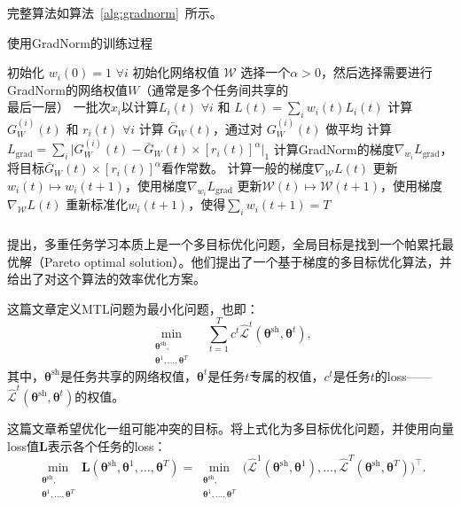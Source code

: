 \documentclass{ctexart}
\begin{document}
完整算法如算法~\ref{alg:gradnorm}~所示。

\begin{algorithm}[htb]
    \caption{使用GradNorm的训练过程}
    \label{alg:gradnorm}
 \begin{algorithmic}
    \State 初始化 $w_i(0)=1$ $\forall i$
    \State 初始化网络权值 $\mathcal{W}$
    \State 选择一个$\alpha> 0$，然后选择需要进行GradNorm的网络权值$W$（通常是多个任务间共享的\\ \hspace{1em} 最后一层）
    一批次$x_i$以计算$L_i(t)$ $\forall i$ 和 $L(t) = \sum_i w_i(t)L_i(t)$ 
    \State 计算 $G_W^{(i)}(t)$ 和 $r_i(t)$ $\forall i$
    \State 计算 $\bar{G}_W(t)$，通过对 $G_W^{(i)}(t)$ 做平均
    \State 计算 $L_{\text{grad}}= \sum_i\rvert G_W^{(i)}(t) - \bar{G}_W(t)\times [r_i(t)]^{\alpha}\rvert_1$
    \State 计算GradNorm的梯度$\nabla_{w_i} L_{\text{grad}}$，将目标$\bar{G}_W(t)\times [r_i(t)]^{\alpha}$看作常数。
    \State 计算一般的梯度$\nabla_{\mathcal{W}} L(t)$
    \State 更新$w_i(t) \mapsto w_i(t+1)$，使用梯度$\nabla_{w_i} L_{\text{grad}}$
    \State 更新$\mathcal{W}(t) \mapsto \mathcal{W}(t+1)$，使用梯度$\nabla_{\mathcal{W}} L(t)$ 
    \State 重新标准化$w_i(t+1)$，使得$\sum_iw_i(t+1) = T$
    \EndFor
 \end{algorithmic}
 \end{algorithm}

\subsubsection{}

\citet{Sener18Pareto}提出，多重任务学习本质上是一个多目标优化问题，全局目标是找到一个帕累托最优解（Pareto optimal solution）。他们提出了一个基于梯度的多目标优化算法，并给出了对这个算法的效率优化方案。

这篇文章定义MTL问题为最小化问题，也即：
\begin{equation}
    \min_{\substack{\bm\theta^\mathrm{sh},\\ \bm\theta^{1},\ldots ,\bm\theta^{T}}}\quad\sum_{t=1}^{T} c^t\hat{\mathcal{L}}^t(\bm\theta^\mathrm{sh}, \bm\theta^{t}),
\end{equation}
其中，$\bm\theta^\mathrm{sh}$是任务共享的网络权值，$\bm\theta^{t}$是任务$t$专属的权值，$c^t$是任务$t$的loss——$\hat{\mathcal{L}}^t(\bm\theta^\mathrm{sh}, \bm\theta^{t})$的权值。

这篇文章希望优化一组可能冲突的目标。\citet{Sener18Pareto}将上式化为多目标优化问题，并使用向量loss值$\mathbf{L}$表示各个任务的loss：
\begin{equation}
    \min_{\substack{\bm\theta^\mathrm{sh},\\ \bm\theta^1,\ldots,\bm\theta^T}} \mathbf{L}(\bm\theta^\mathrm{sh}, \bm\theta^1,\ldots,\bm\theta^T) =
    \min_{\substack{\bm\theta^\mathrm{sh},\\ \bm\theta^1,\ldots,\bm\theta^T}} \big( \hat{\mathcal{L}}^1(\bm\theta^\mathrm{sh},\bm\theta^1), \ldots,  \hat{\mathcal{L}}^T(\bm\theta^\mathrm{sh},\bm\theta^T) \big)^\intercal.
\end{equation}
\end{document}
